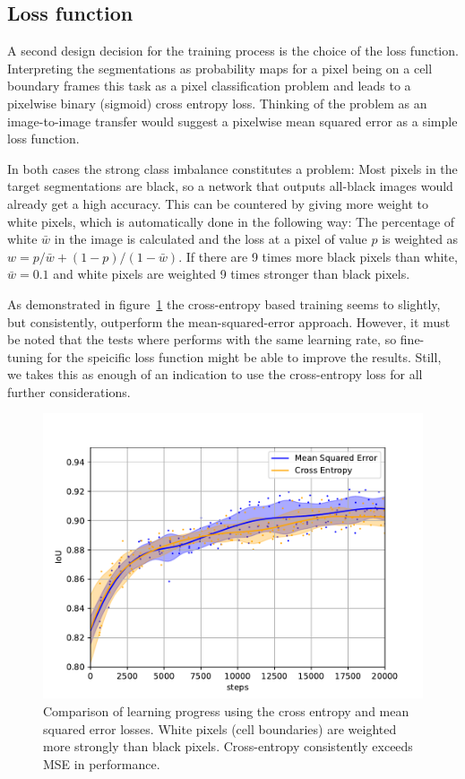 \documentclass[aps,prl,twocolumn,groupedaddress,amsmath,amssymb]{revtex4-1}
\begin{document}
    \subsection{Loss function}
    A second design decision for the training process is the choice of the loss function. 
    Interpreting the segmentations as probability maps for a pixel being on a cell boundary frames
    this task as a pixel classification problem and leads to a pixelwise binary (sigmoid) cross 
    entropy loss. Thinking of the problem as an image-to-image transfer would suggest a pixelwise
    mean squared error as a simple loss function. 

    In both cases the strong class imbalance constitutes a problem: Most pixels in the target 
    segmentations are black, so a network that outputs all-black images would already get a high 
    accuracy. This can be countered by giving more weight to white pixels, which is automatically 
    done in the following way: The percentage of white $\bar{w}$ in the image is calculated 
    and the loss at a pixel of value $p$ is weighted as $w = p/\bar{w} + (1-p)/(1-\bar{w})$. If there
    are 9 times more black pixels than white, $\bar{w}=0.1$ and white pixels are weighted 9 times 
    stronger than black pixels.

    As demonstrated in figure~\ref{fig:mse} the cross-entropy based training seems to slightly, but
    consistently, outperform the mean-squared-error approach. However, it must be noted that the 
    tests where performs with the same learning rate, so fine-tuning for the speicific loss function 
    might be able to improve the results. Still, we takes this as enough of an indication to use the
    cross-entropy loss for all further considerations.

    \begin{figure}[tbp]
        \begin{center}
        \includegraphics[width=\linewidth]{figures/mse.pdf}
        \end{center}
        \caption{Comparison of learning progress using the cross entropy and mean squared error 
        losses. White pixels (cell boundaries) are weighted more strongly than black pixels. 
        Cross-entropy consistently exceeds MSE in performance.}
        \label{fig:mse}
    \end{figure}
\end{document}
